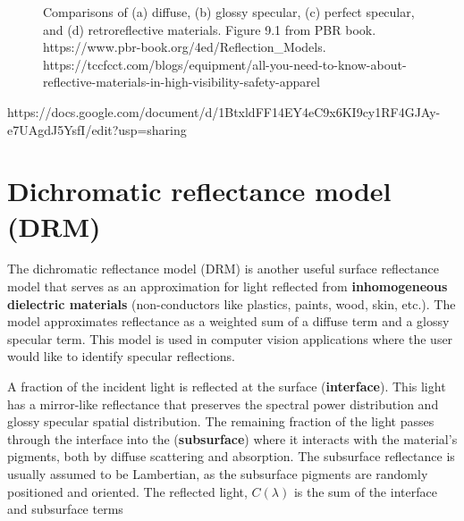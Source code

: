 \documentclass[
  letterpaper,
]{book}
\begin{document}
\begin{figure}


\caption{\label{fig-retroreflective-glass-beads}Comparisons of (a)
diffuse, (b) glossy specular, (c) perfect specular, and (d)
retroreflective materials. Figure 9.1 from PBR book.
https://www.pbr-book.org/4ed/Reflection\_Models.
https://tccfcct.com/blogs/equipment/all-you-need-to-know-about-reflective-materials-in-high-visibility-safety-apparel}

\end{figure}%

https://docs.google.com/document/d/1BtxldFF14EY4eC9x6KI9cy1RF4GJAy-e7UAgdJ5YsfI/edit?usp=sharing

\section{Dichromatic reflectance model
(DRM)}\label{dichromatic-reflectance-model-drm}

The dichromatic reflectance model (DRM) is another useful surface
reflectance model that serves as an approximation for light reflected
from \textbf{inhomogeneous dielectric materials} (non-conductors like
plastics, paints, wood, skin, etc.). The model approximates reflectance
as a weighted sum of a diffuse term and a glossy specular term. This
model is used in computer vision applications where the user would like
to identify specular reflections.

A fraction of the incident light is reflected at the surface
(\textbf{interface}). This light has a mirror-like reflectance that
preserves the spectral power distribution and glossy specular spatial
distribution. The remaining fraction of the light passes through the
interface into the (\textbf{subsurface}) where it interacts with the
material's pigments, both by diffuse scattering and absorption. The
subsurface reflectance is usually assumed to be Lambertian, as the
subsurface pigments are randomly positioned and oriented. The reflected
light, \(C(\lambda)\) is the sum of the interface and subsurface terms
\end{document}
